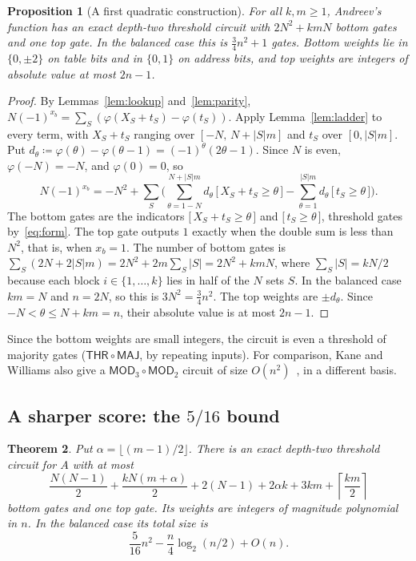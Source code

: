 \documentclass[11pt,letterpaper]{article}
\newtheorem{theorem}{Theorem}
\newtheorem{proposition}[theorem]{Proposition}
\theoremstyle{remark}
\newcommand{\ind}[1]{\bigl[\,#1\,\bigr]}
\newcommand{\THR}{\mathsf{THR}}
\begin{document}
\begin{proposition}[A first quadratic construction]\label{prop:basic}
For all $k,m\ge1$, Andreev's function has an exact depth-two threshold
circuit with $2N^2+kmN$ bottom gates and one top gate. In the balanced case
this is $\tfrac34n^2+1$ gates. Bottom weights lie in $\{0,\pm2\}$ on table
bits and in $\{0,1\}$ on address bits, and
top weights are integers of absolute value at most $2n-1$.
\end{proposition}
\begin{proof}
By Lemmas~\ref{lem:lookup} and~\ref{lem:parity},
$N(-1)^{x_b}=\sum_S\left(\varphi(X_S+t_S)-\varphi(t_S)\right)$.
Apply Lemma~\ref{lem:ladder} to every term, with $X_S+t_S$ ranging over
$[-N,\,N+|S|m]$ and $t_S$ over $[0,|S|m]$. Put
$d_\theta\coloneqq\varphi(\theta)-\varphi(\theta-1)=(-1)^\theta(2\theta-1)$.
Since $N$ is even, $\varphi(-N)=-N$, and $\varphi(0)=0$, so
\[
N(-1)^{x_b}=-N^2+\sum_S\Biggl(\sum_{\theta=1-N}^{N+|S|m}d_\theta\,\ind{X_S+t_S\ge\theta}
-\sum_{\theta=1}^{|S|m}d_\theta\,\ind{t_S\ge\theta}\Biggr).
\]
The bottom gates are the indicators $\ind{X_S+t_S\ge\theta}$ and
$\ind{t_S\ge\theta}$, threshold gates by~\eqref{eq:form}. The top gate
outputs $1$ exactly when the double sum is less than $N^2$, that is, when
$x_b=1$. The number of bottom gates is $\sum_S(2N+2|S|m)=
2N^2+2m\sum_S|S|=2N^2+kmN$, where $\sum_S|S|=kN/2$ because
each block $i\in\{1,\dots,k\}$ lies in half of the $N$ sets $S$.
In the balanced case $km=N$ and $n=2N$, so this is $3N^2=\tfrac34n^2$.
The top weights are $\pm d_\theta$. Since $-N<\theta\le N+km=n$, their
absolute value is at most $2n-1$.
\end{proof}
Since the bottom weights are small integers, the circuit is even a threshold
of majority gates ($\THR\circ\mathsf{MAJ}$, by repeating inputs). For
comparison, Kane and Williams also give a $\mathsf{MOD}_3\circ\mathsf{MOD}_2$
circuit of size $O(n^2)$~\cite[Thm.~1.2]{KW}, in a different basis.

\subsection*{A sharper score: the \texorpdfstring{$5/16$}{5/16} bound}

\begin{theorem}\label{thm:exact}
Put $\alpha=\lfloor(m-1)/2\rfloor$. There is an exact depth-two threshold
circuit for $A$ with at most
\begin{equation}\label{eq:bestcount}
\frac{N(N-1)}2+\frac{kN(m+\alpha)}2
 +2(N-1)+2\alpha k+3km+\left\lceil\frac{km}{2}\right\rceil
\end{equation}
bottom gates and one top gate. Its weights are integers of magnitude
polynomial in $n$. In the balanced case its total size is
\[
\frac5{16}n^2-\frac n4\log_2(n/2)+O(n).
\]
\end{theorem}
\end{document}
